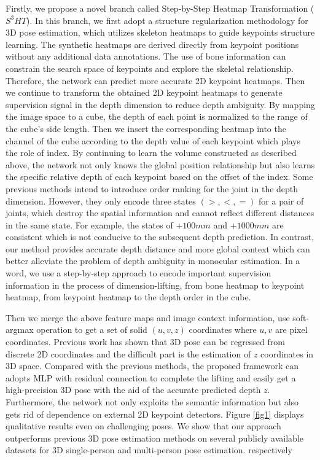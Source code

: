 \documentclass[letterpaper]{article} \usepackage{aaai21}  \usepackage{times}  \usepackage{helvet} \usepackage{courier}  \usepackage[hyphens]{url}  \usepackage{graphicx} \urlstyle{rm} \def\UrlFont{\rm}  \usepackage{natbib}  \usepackage{caption} \frenchspacing  \setlength{\pdfpagewidth}{8.5in}  \setlength{\pdfpageheight}{11in}
\begin{document}
Firstly, we propose a novel branch called Step-by-Step Heatmap Transformation ($S^3HT$). In this branch, we first adopt a structure regularization methodology for 3D pose estimation, which utilizes skeleton heatmaps to guide keypoints structure learning. The synthetic heatmaps are derived directly from keypoint positions without any additional data annotations. The use of bone information can constrain the search space of keypoints and explore the skeletal relationship. Therefore, the network can predict more accurate 2D keypoint heatmaps. Then we continue to transform the obtained 2D keypoint heatmaps to generate supervision signal in the depth dimension to reduce depth ambiguity. By mapping the image space to a cube, the depth of each point is normalized to the range of the cube's side length. Then we insert the corresponding heatmap into the channel of the cube according to the depth value of each keypoint which plays the role of index. By continuing to learn the volume constructed as described above, the network not only knows the global position relationship but also learns the specific relative depth of each keypoint based on the offset of the index. Some previous methods intend to introduce order ranking for the joint in the depth dimension. However, they only encode three states $(>,<,=)$ for a pair of joints, which destroy the spatial information and cannot reflect different distances in the same state. For example, the states of $+100mm$ and $+1000mm$ are consistent which is not conducive to the subsequent depth prediction. In contrast, our method provides accurate depth distance and more global context which can better alleviate the problem of depth ambiguity in monocular estimation. In a word, we use a step-by-step approach to encode important supervision information in the process of dimension-lifting, from bone heatmap to keypoint heatmap, from keypoint heatmap to the depth order in the cube. 

Then we merge the above feature maps and image context information, use soft-argmax operation to get a set of solid $(u, v, z)$ coordinates where $u,v$ are pixel coordinates. Previous work has shown that 3D pose can be regressed from discrete 2D coordinates and the difficult part is the estimation of $z$ coordinates in 3D space. Compared with the previous methods, the proposed framework can adopts MLP with residual connection to complete the lifting and easily get a high-precision 3D pose with the aid of the accurate predicted depth $z$. Furthermore, the network not only exploits the semantic information but also gets rid of dependence on external 2D keypoint detectors. Figure \ref{fig1} displays qualitative results even on challenging poses. We show that our approach outperforms previous 3D pose estimation methods on several publicly available datasets for 3D single-person and multi-person pose estimation. 
respectively
\end{document}
